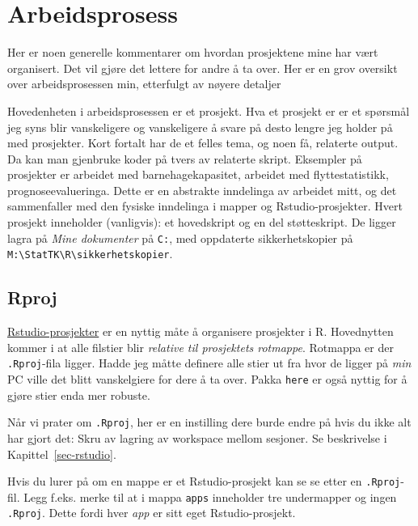 \documentclass[
  letterpaper,
  DIV=11,
  numbers=noendperiod]{scrreprt}
\begin{document}

\hypertarget{arbeidsprosess}{%
\chapter{Arbeidsprosess}\label{arbeidsprosess}}

Her er noen generelle kommentarer om hvordan prosjektene mine har vært
organisert. Det vil gjøre det lettere for andre å ta over. Her er en
grov oversikt over arbeidsprosessen min, etterfulgt av nøyere detaljer

Hovedenheten i arbeidsprosessen er et prosjekt. Hva et prosjekt er er et
spørsmål jeg syns blir vanskeligere og vanskeligere å svare på desto
lengre jeg holder på med prosjekter. Kort fortalt har de et felles tema,
og noen få, relaterte output. Da kan man gjenbruke koder på tvers av
relaterte skript. Eksempler på prosjekter er arbeidet med
barnehagekapasitet, arbeidet med flyttestatistikk, prognoseevalueringa.
Dette er en abstrakte inndelinga av arbeidet mitt, og det sammenfaller
med den fysiske inndelinga i mapper og Rstudio-prosjekter. Hvert
prosjekt inneholder (vanligvis): et hovedskript og en del støtteskript.
De ligger lagra på \emph{Mine dokumenter} på \texttt{C:}, med oppdaterte
sikkerhetskopier på
\texttt{M:\textbackslash{}StatTK\textbackslash{}R\textbackslash{}sikkerhetskopier}.

\hypertarget{rproj}{%
\section{Rproj}\label{rproj}}

\href{https://support.posit.co/hc/en-us/articles/200526207-Using-RStudio-Projects}{Rstudio-prosjekter}
er en nyttig måte å organisere prosjekter i R. Hovednytten kommer i at
alle filstier blir \emph{relative til prosjektets rotmappe}. Rotmappa er
der \texttt{.Rproj}-fila ligger. Hadde jeg måtte definere alle stier ut
fra hvor de ligger på \emph{min} PC ville det blitt vanskelgiere for
dere å ta over. Pakka \texttt{here} er også nyttig for å gjøre stier
enda mer robuste.

Når vi prater om \texttt{.Rproj}, her er en instilling dere burde endre
på hvis du ikke alt har gjort det: Skru av lagring av workspace mellom
sesjoner. Se beskrivelse i Kapittel~\ref{sec-rstudio}.

Hvis du lurer på om en mappe er et Rstudio-prosjekt kan se se etter en
\texttt{.Rproj}-fil. Legg f.eks. merke til at i mappa \texttt{apps}
inneholder tre undermapper og ingen \texttt{.Rproj}. Dette fordi hver
\emph{app} er sitt eget Rstudio-prosjekt.
\end{document}
